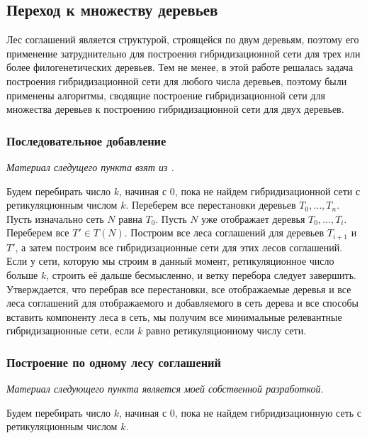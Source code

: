 \documentclass[14pt]{matmex-diploma-custom}
\begin{document}
        
        
        \subsection{Переход к множеству деревьев}
        Лес соглашений является структурой, строящейся по двум деревьям, поэтому его применение затруднительно для построения гибридизационной сети для трех или более филогенетических деревьев. Тем не менее, в этой работе решалась задача построения 
            гибридизационной сети для любого числа деревьев, поэтому были применены алгоритмы, сводящие построение гибридизационной сети для множества деревьев к построению гибридизационной сети для двух деревьев.
            
        \subsubsection{Последовательное добавление}
        
        \textit{Материал следущего пункта взят из \cite{ediss19444}.}
        
        \bigskip
        
        Будем перебирать число $k$, начиная с $0$, пока не найдем гибридизационной сети с ретикуляционным числом $k$. Переберем все перестановки деревьев $T_0, \ldots, T_n$. Пусть изначально сеть $N$ равна $T_0$. Пусть $N$ уже отображает деревья $T_0, \ldots, T_i$. Переберем все $T' \in T(N)$. Построим все леса соглашений для деревьев $T_{i + 1}$ и $T'$, а затем построим все гибридизационные сети для этих лесов соглашений. Если у сети, которую мы строим в данный момент, ретикуляционное число больше $k$, строить её дальше бесмысленно, и ветку перебора следует завершить. Утверждается, что перебрав все перестановки, все отображаемые деревья и все леса соглашений для отображаемого и добавляемого в сеть дерева и все способы вставить компоненту леса в сеть, мы получим все минимальные релевантные гибридизационные сети, если $k$ равно ретикуляционному числу сети.
        \subsubsection{Построение по одному лесу соглашений}
        
        \textit{Материал следующего пункта является моей собственной разработкой.}
            
        \bigskip
        
        Будем перебирать число $k$, начиная с $0$, пока не найдем гибридизационную сеть с ретикуляционным числом $k$.
        
\end{document}
